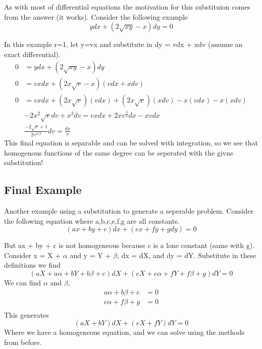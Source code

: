 \documentclass{article}
\newcommand{\be}{\begin{equation}}
\newcommand{\ee}{\end{equation}}
\begin{document}
As with most of differential equations the motivation for this substituion comes from the answer (it works).
Consider the following example
\be
ydx + (2\sqrt{xy} - x) dy = 0
\ee

In this example r=1, let y=vx and substitute in dy = vdx + xdv (assume an exact differential).
\be
\begin{split}
    0 &= ydx + (2\sqrt{xy} - x) dy\\
    0 &= vxdx + (2x\sqrt{v} - x) (vdx + xdv)\\
    0 &= vxdx + (2x\sqrt{v})(vdx) + (2x\sqrt{v})(xdv) - x(vdx) - x(xdv)\\
    &-2x^2\sqrt{v}dv + x^2dv = vxdx + 2xv^{\frac{3}{2}}dx - xvdx \\
    & \frac{-2\sqrt{v}+1}{2v^{3/2}}dv = \frac{dx}{x}
\end{split}
\ee
This final equation is separable and can be solved with integration, so we see that homogenous functions of the same degree can be seperated with the givne substitution!

\subsection*{Final Example}
Another example using a substitution to generate a seperable problem. 
Consider the following equation where a,b,c,e,f,g are all constants.
\be
(ax + by + c) dx + (ex + fy + g dy) = 0
\ee

But ax + by + c is not homogeneous because c is a lone constant (same with g).
Consider x = X + $\alpha$ and y = Y + $\beta$, dx = dX, and dy = dY.
Substitute in these definitions we find
\be
(aX + a\alpha + bY + b\beta + c) dX + (eX + e\alpha + fY + f\beta + g) dY = 0
\ee
We can find $\alpha$ and $\beta$,
\be
\begin{split}
    a\alpha + b\beta + c &= 0 \\
    e\alpha + f\beta + g &= 0 \\
\end{split}
\ee
This generates
\be
(aX + bY)dX + (eX + fY)dY = 0
\ee
Where we have a homogeneous equation, and we can solve using the methods from before.
\end{document}
